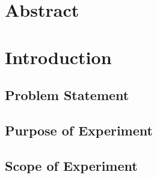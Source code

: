 \section{Abstract}
\label{sec:Abstract}

\section{Introduction}
\label{sec:Introduction}

\subsection{Problem Statement}
\label{sub:Problem Statement}

\subsection{Purpose of Experiment}
\label{sub:Purpose of Experiment}

\subsection{Scope of Experiment}
\label{sub:Scope of Experiment}
